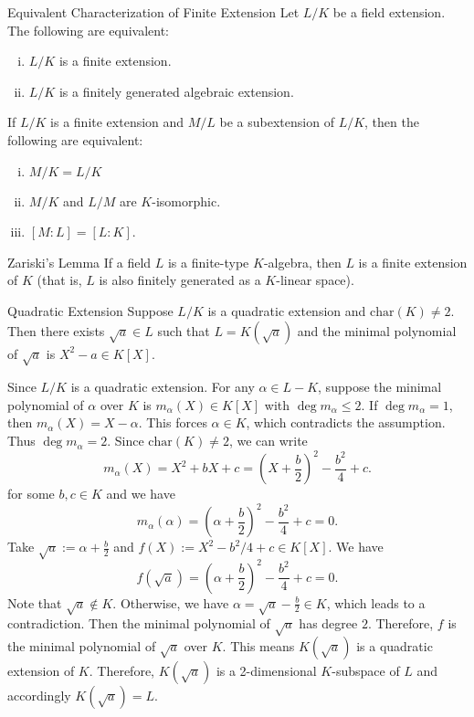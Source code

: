 \begin{proposition}{Equivalent Characterization of Finite Extension}{}
    Let $L/K$ be a field extension. The following are equivalent:
    \begin{enumerate}[(i)]
        \item $L/K$ is a finite extension.
        \item $L/K$ is a finitely generated algebraic extension.
    \end{enumerate}
\end{proposition}

\begin{proposition}{}{}
    If $L/K$ is a finite extension and $M/L$ be a subextension of $L/K$, then the following are equivalent:
    \begin{enumerate}[(i)]
        \item $M/K=L/K$
        \item $M/K$ and $L/M$ are $K$-isomorphic.
        \item $[M:L]=[L:K]$.
    \end{enumerate}
\end{proposition}

\begin{lemma}{Zariski's Lemma}{}
    If a field $L$ is a finite-type $K$-algebra, then $L$ is a finite extension of $K$ (that is, $L$ is also finitely generated as a $K$-linear space).
\end{lemma}

\begin{example}{Quadratic Extension}{}
    Suppose $L/K$ is a quadratic extension and $\mathrm{char}(K)\neq 2$. Then there exists $\sqrt{a}\in L$ such that $L=K(\sqrt{a})$ and the minimal polynomial of $\sqrt{a}$ is $X^2-a\in K[X]$.
\end{example}
\begin{prf}
    Since $L/K$ is a quadratic extension. For any $\alpha\in L-K$, suppose the minimal polynomial of $\alpha$ over $K$ is $m_\alpha(X)\in K[X]$ with $\deg m_\alpha\le 2$. If $\deg m_\alpha=1$, then $m_\alpha(X)=X-\alpha$. This forces $\alpha\in K$, which contradicts the assumption. Thus $\deg m_\alpha=2$. Since $\mathrm{char}(K)\neq 2$, we can write
    \[
    m_\alpha(X)=X^2+bX+c=\left(X+\frac{b}{2}\right)^2-\frac{b^2}{4}+c.
    \]
    for some $b,c\in K$ and we have
    \[
    m_\alpha(\alpha)=\left(\alpha+\frac{b}{2}\right)^2-\frac{b^2}{4}+c=0.
    \]
    Take $\sqrt{a}:=\alpha+\frac{b}{2}$ and $f(X):=X^2-b^2/4+c\in K[X]$. We have 
    \[
       f\left(\sqrt{a}\right)=\left(\alpha+\frac{b}{2}\right)^2-\frac{b^2}{4}+c=0.
    \]
    Note that $\sqrt{a}\notin K$. Otherwise, we have $\alpha=\sqrt{a}-\frac{b}{2}\in K$, which leads to a contradiction. Then the minimal polynomial of $\sqrt{a}$ has degree $2$. Therefore, $f$ is the minimal polynomial of $\sqrt{a}$ over $K$. This means $K(\sqrt{a})$ is a quadratic extension of $K$. Therefore, $K(\sqrt{a})$ is a 2-dimensional $K$-subspace of $L$ and accordingly $K(\sqrt{a})=L$.
\end{prf}

